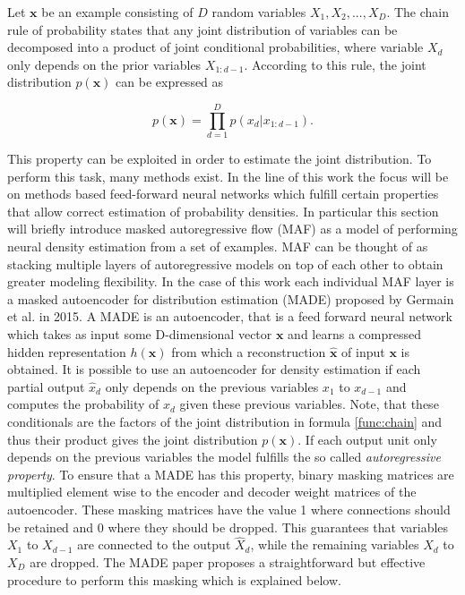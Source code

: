 \documentclass[11pt,titlepage,oneside,openany]{book}
\begin{document}
Let $\pmb{x}$ be an example consisting of $D$ random variables $X_1, X_2,...,X_D$. The chain rule of probability states that any joint distribution of variables can be decomposed into a product of joint conditional probabilities, where variable $X_d$ only depends on the prior variables $X_{1:d-1}$. According to this rule, the joint distribution $p(\pmb{x})$ can be expressed as

\begin{equation}
	\label{func:chain}
	p(\pmb{x}) = \prod_{d=1}^{D} p(x_d|x_{1:d-1}).
\end{equation}

\noindent This property can be exploited in order to estimate the joint distribution. To perform this task, many methods exist. In the line of this work the focus will be on methods based feed-forward neural networks which fulfill certain properties that allow correct estimation of probability densities. In particular this section will briefly introduce masked autoregressive flow (MAF) \cite{papamakarios_masked_2017} as a model of performing neural density estimation from a set of examples. MAF can be thought of as stacking multiple layers of autoregressive models on top of each other to obtain greater modeling flexibility. In the case of this work each individual MAF layer is a masked autoencoder for distribution estimation (MADE) \cite{germain_made_nodate} proposed by Germain et al. in 2015. A MADE is an autoencoder, that is a feed forward neural network which takes as input some D-dimensional vector $\pmb{x}$ and learns a compressed hidden representation $h(\pmb{x})$ from which a reconstruction $\hat{\pmb{x}}$ of input $\pmb{x}$ is obtained. It is possible to use an autoencoder for density estimation if each partial output $\hat{x}_d$ only depends on the previous variables $x_1$ to $x_{d-1}$ and computes the probability of $x_d$ given these previous variables. Note, that these conditionals are the factors of the joint distribution in formula \ref{func:chain} and thus their product gives the joint distribution $p(\pmb{x})$. If each output unit only depends on the previous variables the model fulfills the so called \emph{autoregressive property}. To ensure that a MADE has this property, binary masking matrices are multiplied element wise to the encoder and decoder weight matrices of the autoencoder. These masking matrices have the value 1 where connections should be retained and 0 where they should be dropped. This guarantees that variables $X_1$ to $X_{d-1}$ are connected to the output $\hat{X}_d$, while the remaining variables $X_d$ to $X_D$ are dropped. The MADE paper \cite{germain_made_nodate} proposes a straightforward but effective procedure to perform this masking which is explained below.
\end{document}
